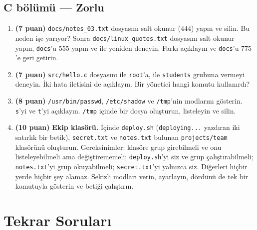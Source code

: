 \subsection*{C bölümü --- Zorlu}
\begin{enumerate}[leftmargin=1.8em,label=\textbf{\arabic*.},resume]
  \item \textbf{(7 puan)} \texttt{docs/notes\_03.txt} dosyasını salt okunur ($444$) yapın ve silin. Bu neden işe yarıyor? Sonra \texttt{docs/linux\_quotes.txt} dosyasını salt okunur yapın, \texttt{docs}'u $555$ yapın ve  ile yeniden deneyin. Farkı açıklayın ve \texttt{docs}'u $775$'e geri getirin.
  \item \textbf{(7 puan)} \texttt{src/hello.c} dosyasını  ile \texttt{root}'a,  ile \texttt{students} grubuna vermeyi deneyin. İki hata iletisini de açıklayın. Bir yönetici hangi komutu kullanırdı?
  \item \textbf{(8 puan)} \texttt{/usr/bin/passwd}, \texttt{/etc/shadow} ve \texttt{/tmp}'nin modlarını gösterin. \texttt{s}'yi ve \texttt{t}'yi açıklayın. \texttt{/tmp} içinde bir dosya oluşturun, listeleyin ve silin.
  \item \textbf{(10 puan)} \textbf{Ekip klasörü.} İçinde \texttt{deploy.sh} (\texttt{deploying...} yazdıran iki satırlık bir betik), \texttt{secret.txt} ve \texttt{notes.txt} bulunan \texttt{projects/team} klasörünü oluşturun. Gereksinimler: klasöre grup girebilmeli ve onu listeleyebilmeli ama değiştirememeli; \texttt{deploy.sh}'yi siz ve grup çalıştırabilmeli; \texttt{notes.txt}'yi grup okuyabilmeli; \texttt{secret.txt}'yi yalnızca siz. Diğerleri hiçbir yerde hiçbir şey alamaz. Sekizli modları verin, ayarlayın, dördünü de tek bir  komutuyla gösterin ve betiği çalıştırın.
\end{enumerate}

\section{Tekrar Soruları}

